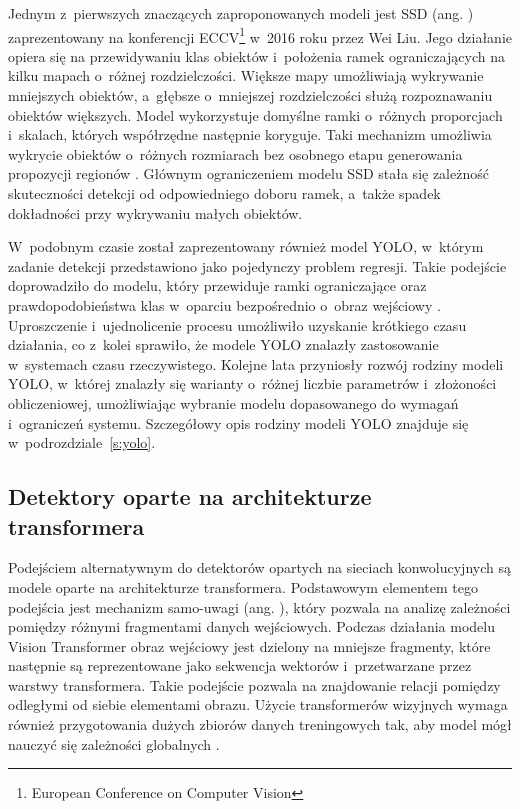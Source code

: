 Jednym z~pierwszych znaczących zaproponowanych modeli jest SSD (ang. ) zaprezentowany na konferencji ECCV\footnote{European Conference on Computer Vision} w~2016 roku przez Wei Liu. Jego działanie opiera się na przewidywaniu klas obiektów i~położenia ramek ograniczających na kilku mapach o~różnej rozdzielczości. Większe mapy umożliwiają wykrywanie mniejszych obiektów, a~głębsze o~mniejszej rozdzielczości służą rozpoznawaniu obiektów większych. Model wykorzystuje domyślne ramki o~różnych proporcjach i~skalach, których współrzędne następnie koryguje. Taki mechanizm umożliwia wykrycie obiektów o~różnych rozmiarach bez osobnego etapu generowania propozycji regionów \cite{bib:Liu_2016}. Głównym ograniczeniem modelu SSD stała się zależność skuteczności detekcji od odpowiedniego doboru ramek, a~także spadek dokładności przy wykrywaniu małych obiektów.

W~podobnym czasie został zaprezentowany również model YOLO, w~którym zadanie detekcji przedstawiono jako pojedynczy problem regresji. Takie podejście doprowadziło do modelu, który przewiduje ramki ograniczające oraz prawdopodobieństwa klas w~oparciu bezpośrednio o~obraz wejściowy \cite{bib:redmon2016lookonceunifiedrealtime}. Uproszczenie i~ujednolicenie procesu umożliwiło uzyskanie krótkiego czasu działania, co z~kolei sprawiło, że modele YOLO znalazły zastosowanie w~systemach czasu rzeczywistego. Kolejne lata przyniosły rozwój rodziny modeli YOLO, w~której znalazły się warianty o~różnej liczbie parametrów i~złożoności obliczeniowej, umożliwiając wybranie modelu dopasowanego do wymagań i~ograniczeń systemu. Szczegółowy opis rodziny modeli YOLO znajduje się w~podrozdziale~\ref{s:yolo}.

\subsection{Detektory oparte na architekturze transformera}

Podejściem alternatywnym do detektorów opartych na sieciach konwolucyjnych są modele oparte na architekturze transformera. Podstawowym elementem tego podejścia jest mechanizm samo-uwagi (ang. ), który pozwala na analizę zależności pomiędzy różnymi fragmentami danych wejściowych. Podczas działania modelu Vision Transformer obraz wejściowy jest dzielony na mniejsze fragmenty, które następnie są reprezentowane jako sekwencja wektorów i~przetwarzane przez warstwy transformera. Takie podejście pozwala na znajdowanie relacji pomiędzy odległymi od siebie elementami obrazu. Użycie transformerów wizyjnych wymaga również przygotowania dużych zbiorów danych treningowych tak, aby model mógł nauczyć się zależności globalnych \cite{bib:dosovitskiy2021imageworth16x16words}.

